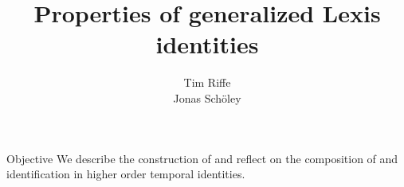 \documentclass[20pt]{beamer}
\title{Properties of generalized Lexis identities}
\subtitle{Tim Riffe \\ Jonas Sch{\"o}ley}		%
\begin{document}

\begin{frame}
	\titlepage
\end{frame}

\begin{frame}[plain]
\Large
\begin{block}{Objective}
We describe the construction of and reflect on the composition of and
identification in higher order temporal identities.
\end{block}

\end{frame}



\begin{frame}[plain]

\end{frame}
\end{document}
